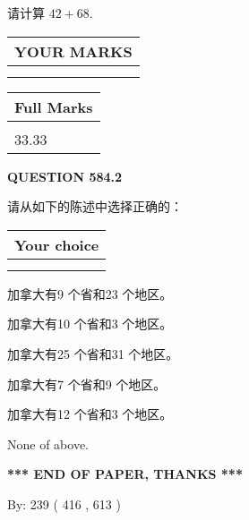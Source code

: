\documentclass{ctexart}
\begin{document}
  
 
请计算 $ %
42 +  %
68 $.
 

 

 
  
\vspace{0.2in}
  
\noindent\begin{tabular}{|l|}
\hline
 YOUR MARKS  \\
\hline
 \\ 
 \\ 
\hline
\end{tabular}
\hspace{0.05in} \begin{tabular}{|l|}
\hline
 Full Marks  \\
\hline
 \\ 
33.33 \\
\hline
\end{tabular}
{\textbf{\Large{QUESTION
584.2 
}}}
  
  
请从如下的陈述中选择正确的：
  
  
\noindent\hspace{3.0in} \begin{tabular}{|l|}
\hline
Your choice \\
\hline
 \\ 
 \\ 
\hline
\end{tabular}
  
  
 
 
加拿大有9 个省和23 个地区。
 
 
加拿大有10 个省和3 个地区。
 
 
加拿大有25 个省和31 个地区。
 
 
加拿大有7 个省和9 个地区。
 
 
加拿大有12 个省和3 个地区。
 
 
 None of above.
 
 
   
   
 \vspace{0.2in}
 
   
   
   
   
\vspace{1.0in} 
{\textbf{\large{ *** END OF PAPER, THANKS *** }}} 
   
   
\hspace{1.0in} By: 
 239 ( 416 ,  613 )
   
\end{document}
